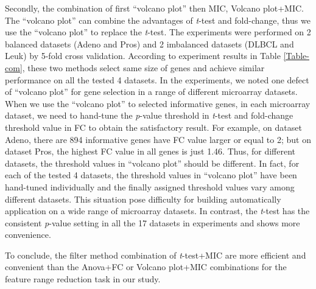 \documentclass[10pt,journal,compsoc]{IEEEtran}
\begin{document}
	Secondly, the combination of first “volcano plot” then MIC, Volcano plot+MIC. The “volcano plot” can combine the advantages of \emph{t}-test and fold-change, thus we use the “volcano plot” to replace the \emph{t}-test. The experiments were performed on 2 balanced datasets (Adeno and Pros) and 2 imbalanced datasets (DLBCL and Leuk) by 5-fold cross validation. According to experiment results in Table \ref{Table-com}, these two methods select same size of genes and achieve similar performance on all the tested 4 datasets.
	In the experiments, we noted one defect of “volcano plot” for gene selection in a range of different microarray datasets. When we use the “volcano plot” to selected informative genes, in each microarray dataset, we need to hand-tune the \emph{p}-value threshold in \emph{t}-test and fold-change threshold value in FC to obtain the satisfactory result. For example, on dataset Adeno, there are 894 informative genes have FC value larger or equal to 2; but on dataset Pros, the highest FC value in all genes is just 1.46. Thus, for different datasets, the threshold values in “volcano plot” should be different. In fact, for each of the tested 4 datasets, the threshold values in “volcano plot” have been hand-tuned individually and the finally assigned threshold values vary among different datasets. This situation pose difficulty for building automatically application on a wide range of microarray datasets. In contrast, the \emph{t}-test has the consistent \emph{p}-value setting in all the 17 datasets in experiments and shows more convenience.

	To conclude, the filter method combination of \emph{t}-test+MIC are more efficient and convenient than the Anova+FC or Volcano plot+MIC combinations for the feature range reduction task in our study.
\end{document}
